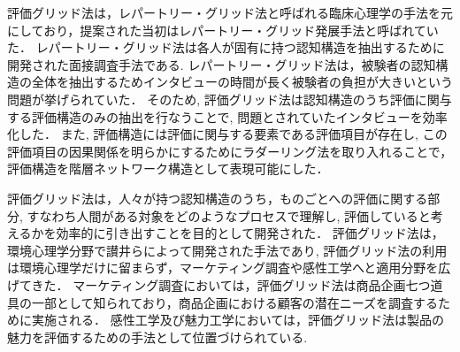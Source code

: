 \documentclass[syuuron]{kuee}
\begin{document}
		評価グリッド法は，レパートリー・グリッド法\cite{rg1}と呼ばれる臨床心理学の手法を元にしており，提案された当初はレパートリー・グリッド発展手法と呼ばれていた．
		レパートリー・グリッド法は各人が固有に持つ認知構造を抽出するために開発された面接調査手法である. 
		レパートリー・グリッド法は，被験者の認知構造の全体を抽出するためインタビューの時間が長く被験者の負担が大きいという問題が挙げられていた．
		そのため, 評価グリッド法は認知構造のうち評価に関与する評価構造のみの抽出を行なうことで, 問題とされていたインタビューを効率化した．
		また, 評価構造には評価に関与する要素である評価項目が存在し, この評価項目の因果関係を明らかにするためにラダーリング法を取り入れることで，
		評価構造を階層ネットワーク構造として表現可能にした．
		
		評価グリッド法は，人々が持つ認知構造のうち，ものごとへの評価に関する部分, 
		すなわち人間がある対象をどのようなプロセスで理解し, 評価していると考えるかを効率的に引き出すことを目的として開発された．
		評価グリッド法は，環境心理学分野で讃井らによって開発された手法であり, 
		評価グリッド法の利用は環境心理学だけに留まらず，マーケティング調査や感性工学へと適用分野を広げてきた\cite{egm1, egm2, egm3}．
		マーケティング調査においては，評価グリッド法は商品企画七つ道具の一部として知られており，商品企画における顧客の潜在ニーズを調査するために実施される．
		感性工学及び魅力工学においては，評価グリッド法は製品の魅力を評価するための手法として位置づけられている. 
		
\end{document}
